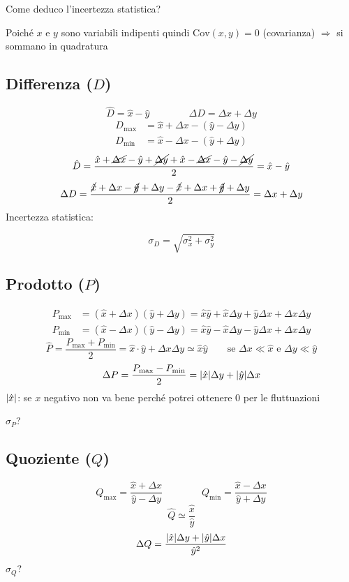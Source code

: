 \documentclass[11pt,a4paper,oneside]{book}
\newcommand{\grigio}[1]{{\color{grigio}#1}}
\DeclarePairedDelimiter{\abs}{\lvert}{\rvert}
\begin{document}
\begin{spunto}
Come deduco l'incertezza statistica?

Poiché $x$ e $y$ sono variabili indipenti quindi $\mathrm{Cov}(x, y) = 0$ \grigio{(covarianza)} $\Rightarrow$ si sommano in quadratura
\end{spunto}

\subsection*{Differenza ($D$)}
\[
  \hat{D} = \hat{x} - \hat{y} \qquad\qquad \Delta D = \Delta x + \Delta y
\]
\[
  \begin{aligned}
    D_{\max} &= \hat{x} + \Delta x - (\hat{y} - \Delta y) \\
    D_{\min} &= \hat{x} - \Delta x - (\hat{y} + \Delta y)
  \end{aligned}
\]
\[
  \hat{D} = \frac{\hat{x} + \cancel{\Delta x} - \hat{y} + \cancel{\Delta y} + \hat{x} - \cancel{\Delta x} - \hat{y} - \cancel{\Delta y}}{2} = \hat{x} - \hat{y}
\]
\[
  \Delta D = \frac{\cancel{\hat{x}} + \Delta x - \cancel{\hat{y}} + \Delta y - \cancel{\hat{x}} + \Delta x + \cancel{\hat{y}} + \Delta y}{2} = \Delta x + \Delta y
\]
Incertezza statistica:
\begin{formulabox}
\[
  \sigma_D = \sqrt{\sigma_x^2 + \sigma_y^2}
\]
\end{formulabox}

\subsection*{Prodotto ($P$)}
\[
  \begin{aligned}
    P_{\max} &= (\hat{x} + \Delta x)(\hat{y} + \Delta y) = \hat{x}\hat{y} + \hat{x}\Delta y + \hat{y}\Delta x + \Delta x \Delta y \\
    P_{\min} &= (\hat{x} - \Delta x)(\hat{y} - \Delta y) = \hat{x}\hat{y} - \hat{x}\Delta y - \hat{y}\Delta x + \Delta x \Delta y
  \end{aligned}
\]
\[
  \hat{P} = \frac{P_{\max} + P_{\min}}{2} = \hat{x} \cdot \hat{y} + \Delta x \Delta y \simeq \hat{x}\hat{y}
  \qquad \text{se } \Delta x \ll \hat{x} \text{ e } \Delta y \ll \hat{y}
\]
\[
  \Delta P = \frac{P_{\max} - P_{\min}}{2} = \abs{\hat{x}} \Delta y + \abs{\hat{y}} \Delta x
\]
\grigio{$\abs{\hat{x}}$: se $x$ negativo non va bene perché potrei ottenere $0$ per le fluttuazioni}

\grigio{$\sigma_P$?}

\subsection*{Quoziente ($Q$)}
\[
  Q_{\max} = \frac{\hat{x} + \Delta x}{\hat{y} - \Delta y} \qquad\qquad
  Q_{\min} = \frac{\hat{x} - \Delta x}{\hat{y} + \Delta y}
\]
\[
  \hat{Q} \simeq \frac{\hat{x}}{\hat{y}}
\]
\[
  \Delta Q = \frac{\abs{\hat{x}} \Delta y + \abs{\hat{y}} \Delta x}{\hat{y}^2}
\]
\grigio{$\sigma_Q$?}
\end{document}
